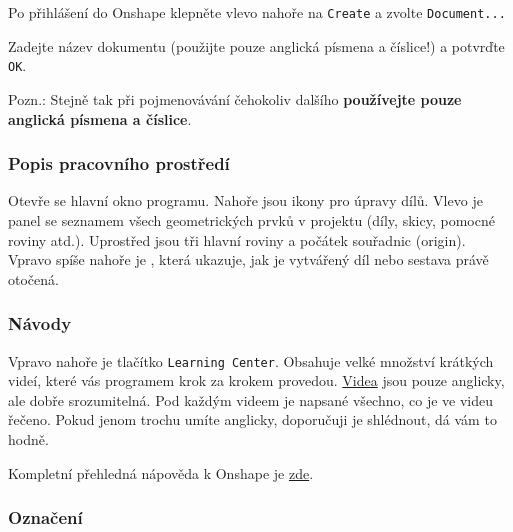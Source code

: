  Po přihlášení do Onshape klepněte vlevo nahoře na {\tt Create} a zvolte {\tt Document...} 

Zadejte název dokumentu (použijte pouze anglická písmena a číslice!) a potvrďte {\tt OK}.  

Pozn.: Stejně tak při pojmenovávání čehokoliv dalšího \textbf{používejte pouze anglická písmena a číslice}.

\subsubsection{Popis pracovního prostředí}

Otevře se hlavní okno programu. 
Nahoře jsou ikony pro úpravy dílů. 
Vlevo je panel se seznamem všech geometrických prvků v projektu (díly, skicy, pomocné roviny atd.). 
Uprostřed jsou tři hlavní roviny a počátek souřadnic (origin). 
Vpravo spíše nahoře je , která ukazuje, jak je vytvářený díl nebo sestava právě otočená. 


\subsubsection{Návody}

Vpravo nahoře je tlačítko {\tt Learning Center}. Obsahuje velké množství krátkých videí, které vás programem krok za krokem provedou. 
\href{https://learn.onshape.com/courses/fundamentals-navigating-onshape}{Videa} jsou pouze anglicky, ale dobře srozumitelná. Pod každým videem je napsané všechno, co je ve videu řečeno. Pokud jenom trochu umíte anglicky, doporučuji je shlédnout, dá vám to hodně. 

Kompletní přehledná nápověda k Onshape je  \href{https://cad.onshape.com/help/Content/gettingstarted.htm?tocpath=Desktop\%20Help\%7C_____3}{zde}.





\subsubsection{Označení}

